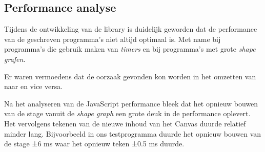 \subsection{Performance analyse}
Tijdens de ontwikkeling van de library is duidelijk geworden dat de performance van de geschreven programma's niet altijd optimaal is. Met name bij programma's die gebruik maken van \emph{timers} en bij programma's met grote \emph{shape grafen}.


Er waren vermoedens dat de oorzaak gevonden kon worden in het omzetten van  naar  en vice versa.

Na het analyseren van de JavaScript performance bleek dat het opnieuw bouwen van de stage vanuit de \emph{shape graph} een grote deuk in de performance oplevert. Het vervolgens tekenen van de nieuwe inhoud van het Canvas duurde relatief minder lang. Bijvoorbeeld in ons testprogramma duurde het opnieuw bouwen van de stage ±6 ms waar het opnieuw teken ±0.5 ms duurde.


